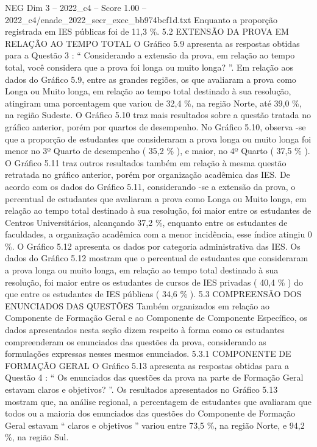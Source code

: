 \begin{textsample}{NEG Dim 3 – 2022\_c4 – Score 1.00 – 2022\_c4/enade\_2022\_secr\_exec\_bb974bcf1d.txt}
Enquanto a proporção registrada em IES públicas foi de 11,3 \%. 5.2 EXTENSÃO DA PROVA EM RELAÇÃO AO TEMPO TOTAL O Gráfico 5.9 apresenta as respostas obtidas para a Questão 3 : “ Considerando a extensão da prova, em relação ao tempo total, você considera que a prova foi longa ou muito longa? ”.
Em relação aos dados do Gráfico 5.9, entre as grandes regiões, os que avaliaram a prova como Longa ou Muito longa, em relação ao tempo total destinado à sua resolução, atingiram uma porcentagem que variou de 32,4 \%, na região Norte, até 39,0 \%, na região Sudeste.
O Gráfico 5.10 traz mais resultados sobre a questão tratada no gráfico anterior, porém por quartos de desempenho.
No Gráfico 5.10, observa -se que a proporção de estudantes que consideraram a prova longa ou muito longa foi menor no 3º Quarto de desempenho ( 35,2 \% ), e maior, no 4º Quarto ( 37,5 \% ).
O Gráfico 5.11 traz outros resultados também em relação à mesma questão retratada no gráfico anterior, porém por organização acadêmica das IES.
De acordo com os dados do Gráfico 5.11, considerando -se a extensão da prova, o percentual de estudantes que avaliaram a prova como Longa ou Muito longa, em relação ao tempo total destinado à sua resolução, foi maior entre os estudantes de Centros Universitários, alcançando 37,2 \%, enquanto entre os estudantes de faculdades, a organização acadêmica com a menor incidência, esse índice atingiu 0 \%.
O Gráfico 5.12 apresenta os dados por categoria administrativa das IES.
Os dados do Gráfico 5.12 mostram que o percentual de estudantes que consideraram a prova longa ou muito longa, em relação ao tempo total destinado à sua resolução, foi maior entre os estudantes de cursos de IES privadas ( 40,4 \% ) do que entre os estudantes de IES públicas ( 34,6 \% ). 5.3 COMPREENSÃO DOS ENUNCIADOS DAS QUESTÕES Também organizados em relação ao Componente de Formação Geral e ao Componente de Componente Específico, os dados apresentados nesta seção dizem respeito à forma como os estudantes compreenderam os enunciados das questões da prova, considerando as formulações expressas nesses mesmos enunciados. 5.3.1 COMPONENTE DE FORMAÇÃO GERAL O Gráfico 5.13 apresenta as respostas obtidas para a Questão 4 : “ Os enunciados das questões da prova na parte de Formação Geral estavam claros e objetivos? ”.
Os resultados apresentados no Gráfico 5.13 mostram que, na análise regional, a percentagem de estudantes que avaliaram que todos ou a maioria dos enunciados das questões do Componente de Formação Geral estavam “ claros e objetivos ” variou entre 73,5 \%, na região Norte, e 94,2 \%, na região Sul.

\end{textsample}

